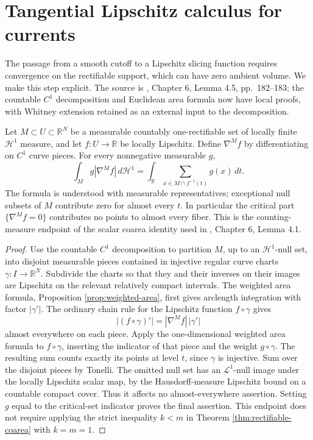 \chapter{Tangential Lipschitz calculus for currents}\label{sec:tangential-lipschitz-calculus}
The passage from a smooth cutoff to a Lipschitz slicing function requires convergence on the rectifiable support, which can have zero ambient volume. We make this step explicit. The source is \cite{Sim18}, Chapter 6, Lemma 4.5, pp.~182--183; the countable $C^1$ decomposition and Euclidean area formula now have local proofs, with Whitney extension retained as an external input to the decomposition.

\begin{proposition}\label{prop:curve-scalar-coarea}
Let $M\subset U\subset\mathbb R^N$ be a measurable countably one-rectifiable set of locally finite $\mathcal H^1$ measure, and let $f:U\to\mathbb R$ be locally Lipschitz. Define $\nabla^Mf$ by differentiating on $C^1$ curve pieces. For every nonnegative measurable $g$,
\[
 \int_M g|\nabla^Mf|\,d\mathcal H^1
 =\int_{\mathbb R}\sum_{x\in M\cap f^{-1}(t)}g(x)\,dt.
\]
The formula is understood with measurable representatives; exceptional null subsets of $M$ contribute zero for almost every $t$. In particular the critical part $\{\nabla^Mf=0\}$ contributes no points to almost every fiber. This is the counting-measure endpoint of the scalar coarea identity used in \cite{Sim18}, Chapter 6, Lemma 4.1.
\end{proposition}
\begin{proof}
Use the countable $C^1$ decomposition to partition $M$, up to an $\mathcal H^1$-null set, into disjoint measurable pieces contained in injective regular curve charts $\gamma:I\to\mathbb R^N$. Subdivide the charts so that they and their inverses on their images are Lipschitz on the relevant relatively compact intervals. The weighted area formula, Proposition \ref{prop:weighted-area}, first gives arclength integration with factor $|\gamma'|$. The ordinary chain rule for the Lipschitz function $f\circ\gamma$ gives
\[
 |(f\circ\gamma)'|=|\nabla^Mf|\,|\gamma'|
\]
almost everywhere on each piece. Apply the one-dimensional weighted area formula to $f\circ\gamma$, inserting the indicator of that piece and the weight $g\circ\gamma$. The resulting sum counts exactly its points at level $t$, since $\gamma$ is injective. Sum over the disjoint pieces by Tonelli. The omitted null set has an $\mathcal L^1$-null image under the locally Lipschitz scalar map, by the Hausdorff-measure Lipschitz bound on a countable compact cover. Thus it affects no almost-everywhere assertion. Setting $g$ equal to the critical-set indicator proves the final assertion. This endpoint does not require applying the strict inequality $k<m$ in Theorem \ref{thm:rectifiable-coarea} with $k=m=1$.
\end{proof}


